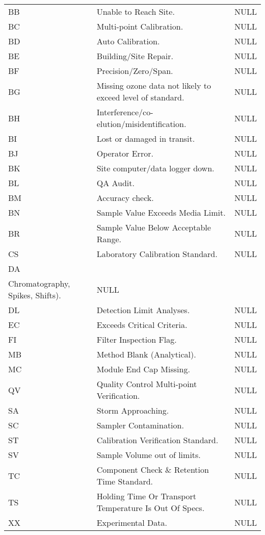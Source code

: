 \begin{longtable}{lll}
BB & Unable to Reach Site. & NULL \\
BC & Multi-point Calibration. & NULL \\
BD & Auto Calibration. & NULL \\
BE & Building/Site Repair. & NULL \\
BF & Precision/Zero/Span. & NULL \\
BG & Missing ozone data not likely to exceed level of standard. & NULL \\
BH & Interference/co-elution/misidentification. & NULL \\
BI & Lost or damaged in transit. & NULL \\
BJ & Operator Error. & NULL \\
BK & Site computer/data logger down. & NULL \\
BL & QA Audit. & NULL \\
BM & Accuracy check. & NULL \\
BN & Sample Value Exceeds Media Limit. & NULL \\
BR & Sample Value Below Acceptable Range. & NULL \\
CS & Laboratory Calibration Standard. & NULL \\
DA & \begin{tabular}[c]{@{}l@{}}Aberrant Data (Corrupt Files, Aberrant\\ Chromatography, Spikes, Shifts).\end{tabular} & NULL \\
DL & Detection Limit Analyses. & NULL \\
EC & Exceeds Critical Criteria. & NULL \\
FI & Filter Inspection Flag. & NULL \\
MB & Method Blank (Analytical). & NULL \\
MC & Module End Cap Missing. & NULL \\
QV & Quality Control Multi-point Verification. & NULL \\
SA & Storm Approaching. & NULL \\
SC & Sampler Contamination. & NULL \\
ST & Calibration Verification Standard. & NULL \\
SV & Sample Volume out of limits. & NULL \\
TC & Component Check \& Retention Time Standard. & NULL \\
TS & Holding Time Or Transport Temperature Is Out Of Specs. & NULL \\
XX & Experimental Data. & NULL \\

\end{longtable}
